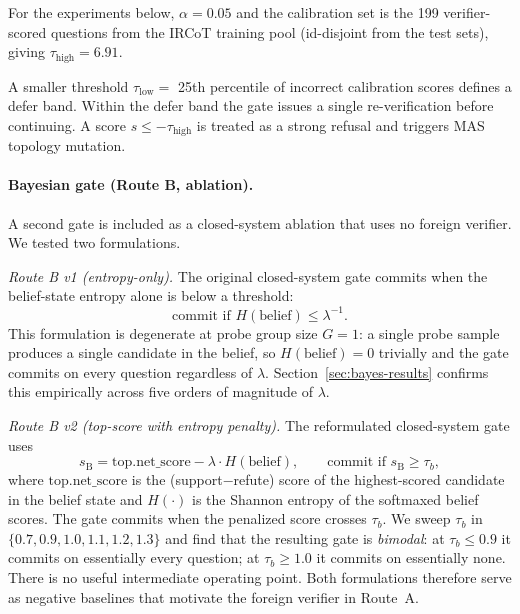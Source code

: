 \documentclass[11pt]{article}
\newcommand{\mas}{MAS\xspace}
\begin{document}
For the experiments below, $\alpha=0.05$ and the calibration set is the 199
verifier-scored questions from the IRCoT training pool (id-disjoint from the
test sets), giving $\tau_{\text{high}}=6.91$.

A smaller threshold $\tau_{\text{low}} = $ 25th percentile of incorrect
calibration scores defines a defer band. Within the defer band the gate
issues a single re-verification before continuing. A score $s \leq -\tau_{\text{high}}$
is treated as a strong refusal and triggers \mas topology mutation.

\paragraph{Bayesian gate (Route B, ablation).}
A second gate is included as a closed-system ablation that uses no foreign
verifier. We tested two formulations.

\textit{Route B v1 (entropy-only).} The original closed-system gate commits
when the belief-state entropy alone is below a threshold:
\begin{equation}
\text{commit if } H(\text{belief}) \leq \lambda^{-1}.
\label{eq:bayes-v1}
\end{equation}
This formulation is degenerate at probe group size $G=1$: a single probe
sample produces a single candidate in the belief, so $H(\text{belief})=0$
trivially and the gate commits on every question regardless of $\lambda$.
Section~\ref{sec:bayes-results} confirms this empirically across five
orders of magnitude of $\lambda$.

\textit{Route B v2 (top-score with entropy penalty).} The reformulated
closed-system gate uses
\begin{equation}
s_{\text{B}} = \text{top}.\text{net\_score} - \lambda \cdot H(\text{belief}),
\qquad
\text{commit if } s_{\text{B}} \geq \tau_b,
\label{eq:bayes-v2}
\end{equation}
where $\text{top}.\text{net\_score}$ is the (support$-$refute) score of the
highest-scored candidate in the belief state and $H(\cdot)$ is the Shannon
entropy of the softmaxed belief scores. The gate commits when the
penalized score crosses $\tau_b$. We sweep $\tau_b$ in
$\{0.7, 0.9, 1.0, 1.1, 1.2, 1.3\}$ and find that the resulting gate is
\emph{bimodal}: at $\tau_b \leq 0.9$ it commits on essentially every
question; at $\tau_b \geq 1.0$ it commits on essentially none. There is no
useful intermediate operating point. Both formulations therefore serve as
negative baselines that motivate the foreign verifier in Route~A.
\end{document}
